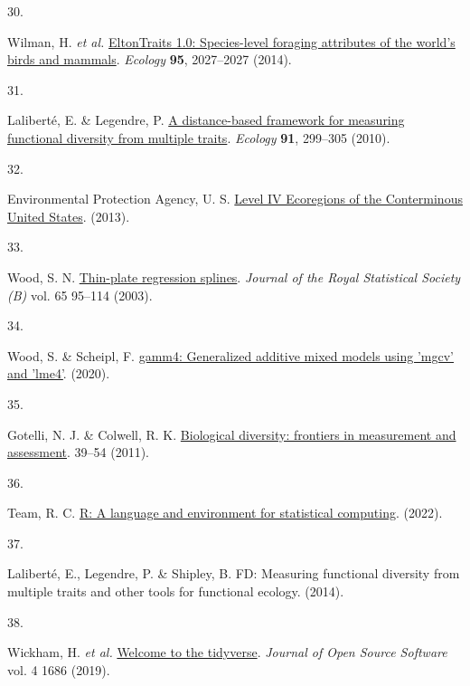 \documentclass[
  10pt,
]{article}
\newlength{\cslhangindent}
\newlength{\csllabelwidth}
\newlength{\cslentryspacingunit} %
\newenvironment{CSLReferences}[2] %
 {%
  \setlength{\parindent}{0pt}
  \ifodd #1
  \let\oldpar\par
  \def\par{\hangindent=\cslhangindent\oldpar}
  \fi
  \setlength{\parskip}{#2\cslentryspacingunit}
 }%
 {}
\newcommand{\CSLLeftMargin}[1]{\parbox[t]{\csllabelwidth}{#1}}
\newcommand{\CSLRightInline}[1]{\parbox[t]{\linewidth - \csllabelwidth}{#1}\break}
\begin{document}
\begin{CSLReferences}{0}{0}
\leavevmode{}%
\CSLLeftMargin{30. }
\CSLRightInline{Wilman, H. \emph{et al.} \href{https://doi.org/10.1890/13-1917.1}{{EltonTraits 1.0: Species-level foraging attributes of the world's birds and mammals}}. \emph{Ecology} \textbf{95}, 2027--2027 (2014).}

\leavevmode{}%
\CSLLeftMargin{31. }
\CSLRightInline{Laliberté, E. \& Legendre, P. \href{https://doi.org/10.1890/08-2244.1}{{A distance-based framework for measuring functional diversity from multiple traits}}. \emph{Ecology} \textbf{91}, 299--305 (2010).}

\leavevmode{}%
\CSLLeftMargin{32. }
\CSLRightInline{Environmental Protection Agency, U. S. \href{https://gaftp.epa.gov/EPADataCommons/ORD/Ecoregions/us/Eco_Level_IV_US.html}{{Level IV Ecoregions of the Conterminous United States}}. (2013).}

\leavevmode{}%
\CSLLeftMargin{33. }
\CSLRightInline{Wood, S. N. \href{http://dx.doi.org/10.1111/1467-9868.00374}{Thin-plate regression splines}. \emph{Journal of the Royal Statistical Society (B)} vol. 65 95--114 (2003).}

\leavevmode{}%
\CSLLeftMargin{34. }
\CSLRightInline{Wood, S. \& Scheipl, F. \href{https://CRAN.R-project.org/package=gamm4}{gamm4: Generalized additive mixed models using 'mgcv' and 'lme4'}. (2020).}

\leavevmode{}%
\CSLLeftMargin{35. }
\CSLRightInline{Gotelli, N. J. \& Colwell, R. K. \href{https://www.ncbi.nlm.nih.gov/pubmed/16352103}{{Biological diversity: frontiers in measurement and assessment}}. 39--54 (2011).}

\leavevmode{}%
\CSLLeftMargin{36. }
\CSLRightInline{Team, R. C. \href{https://www.R-project.org/}{R: A language and environment for statistical computing}. (2022).}

\leavevmode{}%
\CSLLeftMargin{37. }
\CSLRightInline{Laliberté, E., Legendre, P. \& Shipley, B. FD: Measuring functional diversity from multiple traits and other tools for functional ecology. (2014).}

\leavevmode{}%
\CSLLeftMargin{38. }
\CSLRightInline{Wickham, H. \emph{et al.} \href{https://doi.org/10.21105/joss.01686}{Welcome to the tidyverse}. \emph{Journal of Open Source Software} vol. 4 1686 (2019).}


\end{CSLReferences}
\end{document}
